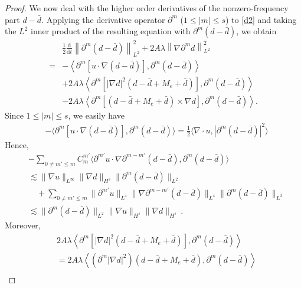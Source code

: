 \documentclass[reqno,11pt]{amsart}
\numberwithin{equation}{section}
\def\p{\partial}
\def\d{\mathrm{d}}
\def\no{\nonumber}
\begin{document}
\begin{proof}
We now deal with the higher order derivatives of the nonzero-frequency part $d - \bar{d}$. Applying the derivative operator $\partial^m$ ($1\le |m|\le s$) to \eqref{d2} and taking the $L^2$ inner product of the resulting equation with $\partial^m (d-\bar{d})$, we obtain
\begin{align}\label{d8}
\no & \frac{1}{2} \frac{\d}{\d t} \left\|\partial^m (d - \bar{d})\right\|_{L^2}^2 + 2A\lambda \left\|\nabla \partial^m d\right\|_{L^2}^2 \\
\no = & -\left\langle \partial^m \left[ u \cdot \nabla (d - \bar{d}) \right], \partial^m (d - \bar{d}) \right\rangle \\
& + 2A\lambda \left\langle \partial^m \left[ |\nabla d|^2 \left(d - \bar{d} +M_e+ \bar{d}\right) \right], \partial^m (d - \bar{d}) \right\rangle \\
\no & - 2A\lambda \left\langle \partial^m \left[ \left(d - \bar{d} +M_e +\bar{d}\right) \times \nabla d \right], \partial^m (d - \bar{d}) \right\rangle.
\end{align}
Since $1\leq |m|\leq s$, we easily have
\begin{equation*}
\begin{aligned}
&-\langle \partial^m[u\cdot\nabla(d-\bar{d})], \partial^m(d-\bar{d})\rangle= \frac{1}{2} \langle \nabla \cdot u, |\partial^m(d-\bar{d})|^2 \rangle 
\end{aligned}
\end{equation*}
Hence,
\begin{equation}\label{d9}
\begin{aligned}
&- \sum_{0 \neq m' \leq m} C_m^{m'} \langle \partial^{m'} u \cdot \nabla \partial^{m-m'}(d-\bar{d}), \partial^m(d-\bar{d}) \rangle \\
&\lesssim \|\nabla u\|_{L^{\infty}} \|\nabla d\|_{H^s}\|\p^m(d-\bar{d})\|_{L^2} \\
&\quad + \sum_{0 \neq m' \leq m} \|\partial^{m'} u\|_{L^4} \|\nabla \partial^{m-m'}(d-\bar{d})\|_{L^4} \|\partial^m (d-\bar{d})\|_{L^2}\\&
 \lesssim\|\p^m(d-\bar{d})\|_{L^2}\|\nabla u\|_{H^s}\|\nabla d\|_{H^s}\,.
\end{aligned}
\end{equation}
Moreover,
\begin{equation}\label{d10}
\begin{aligned}
&2A\lambda \left\langle \partial^m \left[ |\nabla d|^2 \left(d - \bar{d} +M_e +\bar{d}\right) \right], \partial^m (d - \bar{d}) \right\rangle \\
&= 2A\lambda \left\langle \left(\partial^m |\nabla d|^2\right) \left(d - \bar{d} +M_e +\bar{d}\right), \partial^m (d - \bar{d}) \right\rangle \\

\end{aligned}
\end{equation}
\end{proof}
\end{document}

